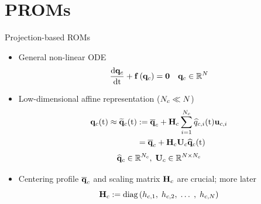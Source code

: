 \documentclass[]{beamer}
\begin{document}
\section*{PROMs}

\begin{frame}{Projection-based ROMs}
    \begin{itemize}
		\item General non-linear ODE
		\begin{equation*}
			\frac{\text{d} \mathbf{q}_{c}}{\text{d} \text{t}} + \mathbf{f} \left(\mathbf{q}_{c}\right) = \mathbf{0} \quad \mathbf{q}_{c} \in \mathbb{R}^{N}
		\end{equation*}
			\item Low-dimensional affine representation ($N_c \ll N$)
		\begin{align*}
			\consVec(\timeVar) \approx \consVecRom(\timeVar) &\defEq \consVecCent + \consScale \sum^{\numConsModes}_{i=1} \consVarCoef{i}(\timeVar) \consTrialVec{i} \\
			&= \consVecCent + \consScale \consTrial \consVecCoef(\timeVar)
		\end{align*}
		\begin{equation*}
			\consVecCoef \in \mathbb{R}^{\numConsModes}, \; \consTrial \in \mathbb{R}^{\numDOF \times \numConsModes}
		\end{equation*}
		\item Centering profile $\mathbf{\overline{q}}_{c}$ and scaling matrix $\consScale$ are crucial; more later
		\begin{equation*}
			\consScale \defEq \text{diag}\left( \consScaleVar{1}, \; \consScaleVar{2}, \; \hdots \;, \; \consScaleVar{\numDOF} \right)
		\end{equation*}
	\end{itemize}
\end{frame}
\end{document}
